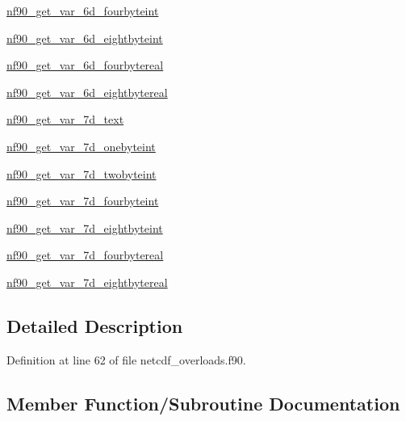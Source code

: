 \begin{DoxyCompactItemize}
\item 
\hyperlink{interfacenf90__get__var_a5f59433b7fd492dee5bcd943a0b2aaf0}{nf90\+\_\+get\+\_\+var\+\_\+6d\+\_\+fourbyteint}
\item 
\hyperlink{interfacenf90__get__var_ade8ea85f47d4776052206ec04bcd2b90}{nf90\+\_\+get\+\_\+var\+\_\+6d\+\_\+eightbyteint}
\item 
\hyperlink{interfacenf90__get__var_ae78b8e491366451f49cf8d27f1ebbd32}{nf90\+\_\+get\+\_\+var\+\_\+6d\+\_\+fourbytereal}
\item 
\hyperlink{interfacenf90__get__var_afcd9d02b2a1d885fabe8d0c996fd1e71}{nf90\+\_\+get\+\_\+var\+\_\+6d\+\_\+eightbytereal}
\item 
\hyperlink{interfacenf90__get__var_af314dbda46bff67d31cfff1c891ad982}{nf90\+\_\+get\+\_\+var\+\_\+7d\+\_\+text}
\item 
\hyperlink{interfacenf90__get__var_a8293ab30a02e7d0f0c5eed91736c835e}{nf90\+\_\+get\+\_\+var\+\_\+7d\+\_\+onebyteint}
\item 
\hyperlink{interfacenf90__get__var_a5b3578cd296db040fb4ca92ca2ca2b10}{nf90\+\_\+get\+\_\+var\+\_\+7d\+\_\+twobyteint}
\item 
\hyperlink{interfacenf90__get__var_a1349ef1fd7d6bff14e560ca3969a837b}{nf90\+\_\+get\+\_\+var\+\_\+7d\+\_\+fourbyteint}
\item 
\hyperlink{interfacenf90__get__var_a858186afdacd5483bd2b3c66bf12bb5a}{nf90\+\_\+get\+\_\+var\+\_\+7d\+\_\+eightbyteint}
\item 
\hyperlink{interfacenf90__get__var_a97bb4ea911de54411c178e322361669b}{nf90\+\_\+get\+\_\+var\+\_\+7d\+\_\+fourbytereal}
\item 
\hyperlink{interfacenf90__get__var_a25f0551e5188d0b3270d10a35b70654b}{nf90\+\_\+get\+\_\+var\+\_\+7d\+\_\+eightbytereal}
\end{DoxyCompactItemize}


\subsection{Detailed Description}


Definition at line 62 of file netcdf\+\_\+overloads.\+f90.



\subsection{Member Function/\+Subroutine Documentation}
\mbox{\label{interfacenf90__get__var_abab8c3c3fb95fe3cfd0df48b7b135628}} 
